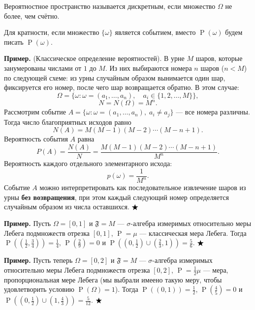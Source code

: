 \documentclass[12pt]{article}
\numberwithin{theorem}{section}
\theoremstyle{definition}
\newenvironment{example}{\indent \textbf{Пример.}}{$ \hfill \bigstar $}
\newcommand{\defin}[2]{\hypertarget{#2}{{\color{red} #1}}}
\newcommand{\prob}{\operatorname{P}}
\newcommand{\events}{\mathfrak{F}}
\begin{document}
	Вероятностное пространство называется \defin{дискретным}{discr}, если множество $ \Omega $ не более, чем счётно.
	
	Для кратности, если множество $ \{\omega\} $ является событием, вместо $ \prob({\omega}) $ будем писать $ \prob(\omega) $.
	
	\begin{example}
		(Классическое определение вероятностей).
		В урне $M$ шаров, которые занумерованы числами от $1$ до $M$.  
		Из них выбираются номера $n$ шаров ($n < M$) по следующей схеме:  
		из урны случайным образом вынимается один шар, фиксируется его номер, после чего шар возвращается обратно.
		В этом случае:
		\[
		\Omega = \{ \omega : \omega = (a_1, \ldots, a_n),\quad a_i \in \{1, 2, \ldots, M\} \},
		\]
		\[
		N = N(\Omega) = M^n.
		\]
		Рассмотрим событие $A = \{ \omega : \omega = (a_1, \ldots, a_n),\; a_i \neq a_j \}$ — все номера различны.
		Тогда число благоприятных исходов равно
		\[
		N(A) = M(M - 1)(M - 2) \cdots (M - n + 1).
		\]
		Вероятность события $A$ равна
		\[
		P(A) = \frac{N(A)}{N} = \frac{M(M - 1)(M - 2) \cdots (M - n + 1)}{M^n}.
		\]
		Вероятность каждого отдельного элементарного исхода:
		\[
		p(\omega) = \frac{1}{M^n}.
		\]
		Событие $A$ можно интерпретировать как последовательное извлечение шаров из урны \textbf{без возвращения},  
		при этом каждый следующий номер определяется случайным образом из числа оставшихся.
	\end{example}
	
	\begin{example}
		Пусть $ \Omega = [0, 1] $ и $ \events = M $ --- $ \sigma $-алгебра измеримых относительно меры Лебега
		подмножеств отрезка $ [0, 1] $, $ \prob = \mu $ --- классическая мера Лебега.
		Тогда $ \prob((\tfrac{1}{2}, \tfrac{3}{4})) = \tfrac{1}{4} $, $ \prob(\tfrac{2}{9}) = 0 $ 
		и $ \prob((0,\tfrac{1}{2}) \cup (\tfrac{2}{3}, 1)) = \tfrac{5}{6} $.
	\end{example}
	
	\begin{example}
		Пусть теперь $ \Omega = [0, 2] $ и $ \events = M $ --- $ \sigma $-алгебра измеримых относительно меры Лебега
		подмножеств отрезка $ [0, 2] $, $ \prob = \tfrac{1}{2}\mu $ --- мера, пропорциональная мере Лебега (мы выбрали имеено такую меру, чтобы удовлетворить условию $ \prob(\Omega) = 1 $).
		Тогда $ \prob((0, 1)) = \tfrac{1}{2} $, $ \prob(\tfrac{4}{5}) = 0 $ и $ \prob((0,\tfrac{1}{2}) \cup (1, \tfrac{4}{3})) = \tfrac{5}{12} $.
	\end{example}
	
\end{document}
